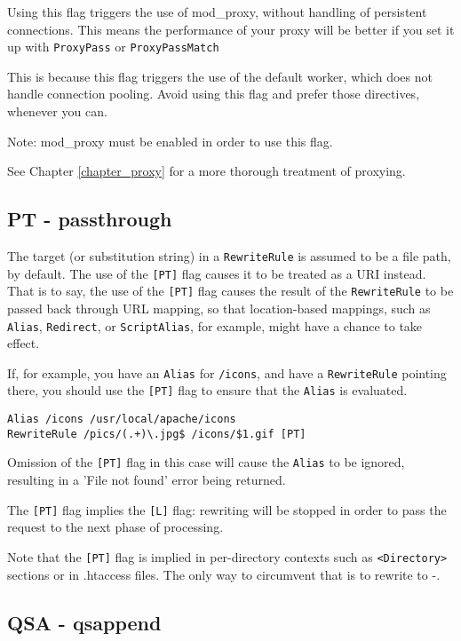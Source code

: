 Using this flag triggers the use of mod\_proxy, without handling of persistent connections. This means the performance of your proxy will be better if you set it up with \verb~ProxyPass~ or \verb~ProxyPassMatch~

This is because this flag triggers the use of the default worker, which does not handle connection pooling.
Avoid using this flag and prefer those directives, whenever you can.

Note: mod\_proxy must be enabled in order to use this flag.

See Chapter \ref{chapter_proxy} for a more thorough treatment of proxying.

\subsection{PT - passthrough}
\label{ptflag}

The target (or substitution string) in a \verb~RewriteRule~ is assumed to be a file path, by default. The use of the \verb~[PT]~ flag causes it to be treated as a URI instead. That is to say, the use of the \verb~[PT]~ flag causes the result of the \verb~RewriteRule~ to be passed back through URL mapping, so that location-based mappings, such as \verb~Alias~, \verb~Redirect~, or \verb~ScriptAlias~, for example, might have a chance to take effect.

If, for example, you have an \verb~Alias~ for \verb~/icons~, and have a \verb~RewriteRule~ pointing there, you should use the \verb~[PT]~ flag to ensure that the \verb~Alias~ is evaluated.

\begin{verbatim}
Alias /icons /usr/local/apache/icons
RewriteRule /pics/(.+)\.jpg$ /icons/$1.gif [PT]
\end{verbatim}

Omission of the \verb~[PT]~ flag in this case will cause the \verb~Alias~ to be ignored, resulting in a 'File not found' error being returned.

The \verb~[PT]~ flag implies the \verb~[L]~ flag: rewriting will be stopped in order to pass the request to the next phase of processing.

Note that the \verb~[PT]~ flag is implied in per-directory contexts such as \verb~<Directory>~ sections or in .htaccess files. The only way to circumvent that is to rewrite to -.

\subsection{QSA - qsappend}
\label{qsaflag}

